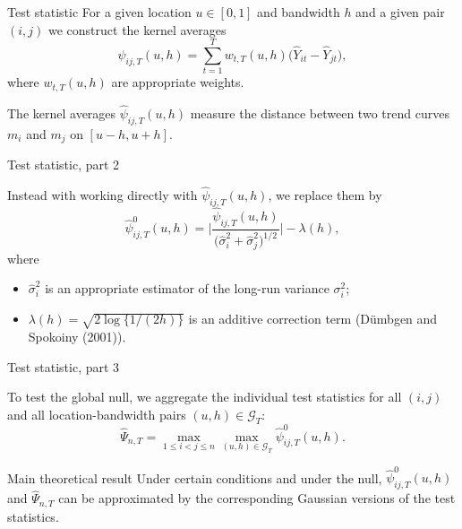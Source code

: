 \documentclass[10pt, handout]{beamer}
\begin{document}
\begin{frame}{Test statistic}
For a given location $u \in [0,1]$ and bandwidth $h$ and a given pair $(i, j)$ we construct the kernel averages
\begin{equation*}
\widehat{\psi}_{ij, T}(u,h) = \sum\limits_{t=1}^T w_{t,T}(u,h) \big(\widehat{Y}_{it} - \widehat{Y}_{jt}), 
\end{equation*}
\vspace{-3mm}
where $w_{t,T}(u,h)$ are appropriate weights.\pause

\vspace{3mm}
The kernel averages $\widehat{\psi}_{ij, T}(u,h)$ measure the distance between two trend curves $m_i$ and $m_j$ on $[u - h, u + h]$.

\end{frame}
\begin{frame}{Test statistic, part 2}

Instead with working directly with $\widehat{\psi}_{ij, T}(u,h)$, we replace them by
\begin{equation*}
\widehat{\psi}^0_{ij, T}(u,h) = \bigg|\frac{\widehat{\psi}_{ij, T}(u,h)}{\big(\widehat{\sigma}_i^2 + \widehat{\sigma}_j^2\big)^{1/2}}\bigg| - \lambda(h), 
\end{equation*}\pause
\vspace{-3mm}
where 
\begin{itemize}
\item $\widehat{\sigma}_i^2$ is an appropriate estimator of the long-run variance $\sigma^2_i$;\pause
\item $\lambda(h) = \sqrt{2 \log \{ 1/(2h) \}}$ is an additive correction term (D{\"u}mbgen and Spokoiny (2001)). %
\end{itemize}
\end{frame}

\begin{frame}{Test statistic, part 3}

To test the global null, we aggregate the individual test statistics \linebreak for all $(i, j)$ and all location-bandwidth pairs $(u, h) \in \mathcal{G}_T$:
\begin{equation*}
\widehat{\Psi}_{n, T} = \max_{1 \leq i < j \leq n} \max_{(u,h) \in \mathcal{G}_T} \widehat{\psi}^0_{ij, T}(u,h). 
\end{equation*}\pause
\vspace{-3mm}
\begin{block}{Main theoretical result}
Under certain conditions and under the null, $\widehat{\psi}^0_{ij, T}(u,h)$ and $\widehat{\Psi}_{n, T}$ can be approximated by the corresponding Gaussian versions of the test statistics.
\end{block}
\end{frame}
\end{document}
